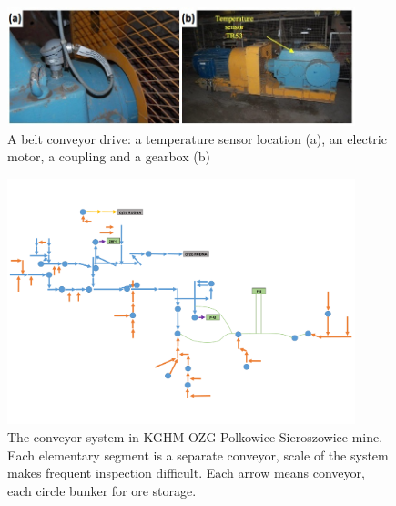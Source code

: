 \documentclass[3p,times,12pt]{elsarticle}
\begin{document}
\begin{figure}[ht!]
\centering
\includegraphics[width=0.9\textwidth]{machine_and_temperature_sensors.jpg}
\caption{A belt conveyor drive: a temperature sensor location (a), an electric motor, a coupling and a gearbox (b) }
\label{fig:machine}
\end{figure}






\begin{figure}

\centering
\includegraphics[width=0.9\textwidth]{ZGPS_conveyor_system.pdf}
\caption{The conveyor system in KGHM OZG Polkowice-Sieroszowice mine. Each elementary segment is a separate conveyor, scale of the system makes frequent inspection difficult. Each arrow means conveyor, each circle bunker for ore storage.}
\label{fig:conveyor_system}
\end{figure}
\end{document}
